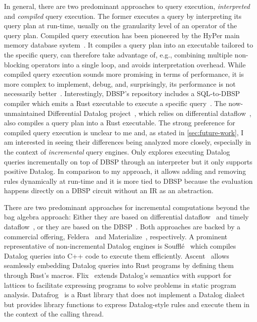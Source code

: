 In general, there are two predominant approaches to query execution,
\emph{interpreted} and \emph{compiled} query execution.
The former executes a query by interpreting its query plan at run-time,
usually on the granularity level of an operator of the query plan.
Compiled query execution has been pioneered by the HyPer main memory database
system~\cite{neumann2011efficiently}.
It compiles a query plan into an executable tailored to the specific query,
can therefore take advantage of, e.g., combining multiple non-blocking operators
into a single loop, and avoids interpretation overhead.
While compiled query execution sounds more promising in terms of performance,
it is more complex to implement, debug, and, surprisingly, its performance
is not necessarily better~\cite{kersten2018everything}.
Interestingly, DBSP's repository includes a SQL-to-DBSP compiler which emits
a Rust executable to execute a specific query~\cite{felderarepo}.
The now-unmaintained Differential Datalog project~\cite{ddlog, ddlogpaper},
which relies on differential dataflow~\cite{mcsherry2013differential},
also compiles a query plan into a Rust executable.
The strong preference for compiled query execution is unclear to me and,
as stated in \ref{sec:future-work}, I am interested in seeing their differences
being analyzed more closely, especially in the context of \emph{incremental}
query engines.
Only \cite{dynamicdatalog} explores executing Datalog queries incrementally
on top of DBSP through an interpreter but it only supports positive Datalog.
In comparison to my approach, it allows adding and removing rules dynamically
at run-time and it is more tied to DBSP because the evaluation happens
directly on a DBSP circuit without an \ac{IR} as an abstraction.

There are two predominant approaches for incremental computations beyond
the bag algebra approach:
Either they are based on differential dataflow~\cite{mcsherry2013differential}
and timely dataflow~\cite{timelydataflow}, or they are based on
the DBSP~\cite{budiu2024dbsp, budiu2025dbsp}.
Both approaches are backed by a commercial offering,
Feldera~\cite{felderainc} and Materialize~\cite{materializeinc}, respectively.
A prominent representative of non-incremental Datalog engines is
Soufflé~\cite{souffle} which compiles Datalog queries into C++ code to execute
them efficiently.
Ascent~\cite{ascent} allows seamlessly embedding Datalog queries into Rust
programs by defining them through Rust's macros.
Flix~\cite{flix} extends Datalog's semantics with support for lattices to
facilitate expressing programs to solve problems in static program analysis.
Datafrog~\cite{datafrog} is a Rust library that does not implement a Datalog
dialect but provides library functions to express Datalog-style rules and
execute them in the context of the calling thread.
